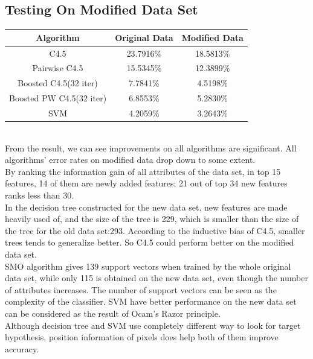 \documentclass[a4paper,11pt]{article}
\begin{document}
\subsection{Testing On Modified Data Set}
\vspace{0.5cm}
\begin{tabular}{c c c}
Algorithm		&	Original Data	&Modified Data\\
\hline \hline
C4.5                            &23.7916\%		& 18.5813\%\\
Pairwise C4.5                   &15.5345\%      & 12.3899\%\\
Boosted C4.5(32 iter)	        &7.7841\%		& 4.5198\%\\
Boosted PW C4.5(32 iter)	    &6.8553\%       & 5.2830\%\\
SVM                         	&4.2059\%       & 3.2643\%\\
\end{tabular}
\vspace{0.5cm}\\
From the result, we can see improvements on all algorithms are significant. All algorithms' error rates on modified data drop down to some extent.\\
By ranking the information gain of all attributes of the data set, in top 15 features, 14 of them are newly added features; 21 out of top 34 new features ranks less than 30. \\
In the decision tree constructed for the new data set, new features are made heavily used of, and the size of the tree is 229, which is smaller than the size of the tree for the old data set:293. According to the inductive bias of C4.5, smaller trees tends to generalize better. So C4.5 could perform better on the modified data set.\\
SMO algorithm gives 139 support vectors when trained by the whole original data set, while only 115 is obtained on the new data set, even though the number of attributes increases. The number of support vectors can be seen as the complexity of the classifier. SVM have better performance on the new data set can be considered as the result of Ocam's Razor principle.\\
Although decision tree and SVM use completely different way to look for target hypothesis, position information of pixels does help both of them improve accuracy.
\end{document}
